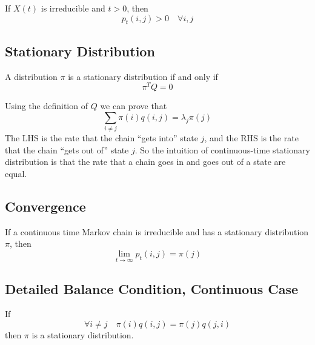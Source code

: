         \begin{lemma}\label{lem:NecessaryConditionOfIrreducibility}
            If $X(t)$ is irreducible and $t>0$, then
            \[ p_t(i,j) > 0 \quad \forall i,j \]
        \end{lemma}

    \subsection{Stationary Distribution}
        \begin{lemma}\label{lem:ContinuousTimeStationaryDistribution}
            A distribution $\pi$ is a stationary distribution if and only if
            \[ \pi^T Q = 0 \]
        \end{lemma}
        \begin{remark}
            Using the definition of $Q$ we can prove that
            \[ \sum_{i \neq j}\pi(i)q(i,j) = \lambda_j\pi(j) \]
            The LHS is the rate that the chain ``gets into'' state $j$, and the RHS is the rate that the chain ``gets out of'' state $j$. So the intuition of continuous-time stationary distribution is that the rate that a chain goes in and goes out of a state are equal.
        \end{remark}

    \subsection{Convergence}
        \begin{theorem}\label{thm:ConvergenceOfCTMarkovChain}
            If a continuous time Markov chain is irreducible and has a stationary distribution $\pi$, then
            \[ \lim_{t\to\infty}p_t(i,j) = \pi(j) \]
        \end{theorem}

    \subsection{Detailed Balance Condition, Continuous Case}
        \begin{theorem}\label{thm:DetailedBalanceConditionOfCTMarkovChain}
            If
            \[ \forall i \neq j \quad \pi(i)q(i,j) = \pi(j)q(j,i) \]
            then $\pi$ is a stationary distribution.
        \end{theorem}
